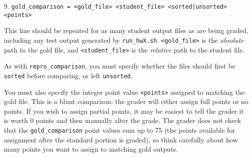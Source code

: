\documentclass[12pt]{article}
\begin{document}
\vspace{5pt}
\newpage

9. \texttt{gold\_comparison = <gold\_file> <student\_file> <sorted|unsorted> <points>}

This line should be repeated for as many student output files as are being graded, including any test output generated by \texttt{run\_hwX.sh}. \texttt{<gold\_file>} is the \textit{absolute} path to the gold file, and \texttt{<student\_file>} is the \textit{relative} path to the student file.	

As with \texttt{repro\_comparison}, you must specify whether the files should first be \texttt{sorted} before comparing, or left \texttt{unsorted}.

You must also specify the integer point value \texttt{<points>} assigned to matching the gold file. This is a blunt comparison: the grader will either assign full points or no points. If you wish to assign partial points, it may be easiest to tell the grader it is worth 0 points and then manually alter the grade. The grader does not check that the \texttt{gold\_comparison} point values sum up to 75 (the points available for assignment after the standard portion is graded), so think carefully about how many points you want to assign to matching gold outputs.

\vspace{5pt}

\begin{comment}
\noindent \textbf{The following config lines are for future use (see \S\ref{sec:future}), and are not used by the current program.}

\vspace{5pt}

10. \texttt{run\_script = <run\_hwX.sh>}

This is the place to point the config file to the \texttt{run\_hwX.sh} file described in \S\ref{sec:fileslist}. Currently this is executed by a separate wrapper.

\vspace{5pt}

11. \texttt{cmd = <condor cmd file>}

\texttt{<condor cmd file>} is a generic condor file that is used to run \texttt{run\_script} for all students. It should probably never be changed from the \texttt{hw.cmd} file present in the grader directory. As with \#7, this is currently executed by a separate wrapper.

\vspace{5pt}
\end{comment}
\end{document}
